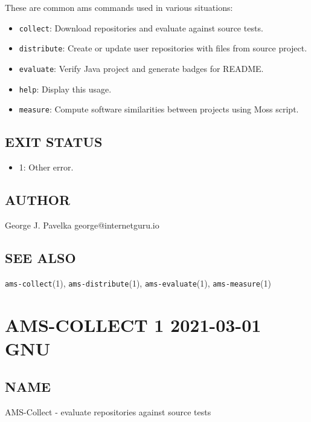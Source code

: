 These are common ams commands used in various situations:

\begin{itemize}
\item
  \texttt{collect}: Download repositories and evaluate against source tests.
\item
  \texttt{distribute}: Create or update user repositories with files from source project.
\item
  \texttt{evaluate}: Verify Java project and generate badges for README.
\item
  \texttt{help}: Display this usage.
\item
  \texttt{measure}: Compute software similarities between projects using Moss script.
\end{itemize}

\subsection{EXIT STATUS}\label{exit-status}

\begin{itemize}
\item
  1: Other error.
\end{itemize}

\subsection{AUTHOR}\label{author}

George J. Pavelka george@internetguru.io

\subsection{SEE ALSO}\label{see-also}

\texttt{ams-collect}(1), \texttt{ams-distribute}(1), \texttt{ams-evaluate}(1), \texttt{ams-measure}(1)

\section{AMS-COLLECT 1 2021-03-01 GNU}\label{ams-collect-1-2021-03-01-gnu-user-manuals}

\subsection{NAME}\label{name-1}

AMS-Collect - evaluate repositories against source tests

